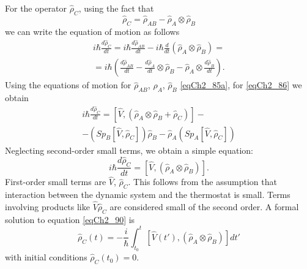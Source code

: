 For the operator $\hat{\rho}_C$, using the fact that  
\[
\hat{\rho}_C = \hat{\rho}_{AB} - \hat{\rho}_A \otimes \hat{\rho}_B
\]
we can write the equation of motion as follows
\begin{eqnarray}
i \hbar \frac{d \hat{\rho}_C}{d t} = i \hbar \frac{d
  \hat{\rho}_{AB}}{d t} - i \hbar 
\frac{d}{d t} \left(\hat{\rho}_A \otimes \hat{\rho}_B\right) = 
\nonumber \\
= i \hbar
\left(
\frac{d \hat{\rho}_{AB}}{d t} -
\frac{d \hat{\rho}_{A}}{d t} \otimes \hat{\rho}_{B} - 
\hat{\rho}_{A} \otimes \frac{d \hat{\rho}_{B}}{d t}
\right).
\label{eqCh2_86}
\end{eqnarray}
Using the equations of motion for $\hat{\rho}_{AB}$, $\hat{\rho}_{A}$,
$\hat{\rho}_{B}$  \eqref{eqCh2_85a},  for \eqref{eqCh2_86} we obtain 
\begin{eqnarray}
i \hbar \frac{d \hat{\rho}_C}{d t} = 
\left[\hat{V}, \left(\hat{\rho}_A \otimes \hat{\rho}_B +
  \hat{\rho}_{C}\right)\right] - 
\nonumber \\
- 
\left(Sp_B\left[\hat{V}, \hat{\rho}_C\right]\right)\hat{\rho}_B -
\hat{\rho}_A \left(Sp_A\left[\hat{V}, \hat{\rho}_C\right]\right)
\label{eqCh2_89}
\end{eqnarray}
Neglecting second-order small terms, we obtain a simple equation:
\begin{equation}
i \hbar \frac{d \hat{\rho}_C}{d t} = 
\left[\hat{V}, \left(\hat{\rho}_A \otimes \hat{\rho}_B\right)\right]. 
\label{eqCh2_90}
\end{equation}
First-order small terms are $\hat{V}$, $\hat{\rho}_C$.
This follows from the assumption that interaction between the dynamic
system and the thermostat is small. Terms involving products like $\hat{V}\hat{\rho}_C$ are considered small of the second order. A formal solution to equation \eqref{eqCh2_90} is 
\begin{equation}
\hat{\rho}_C\left(t\right) = - \frac{i}{\hbar}\int_{t_0}^t
\left[\hat{V}\left(t'\right), \left(\hat{\rho}_A \otimes
  \hat{\rho}_B\right)\right] dt' 
\label{eqCh2_91}
\end{equation}
with initial conditions $\hat{\rho}_C\left(t_0\right) = 0$. 


